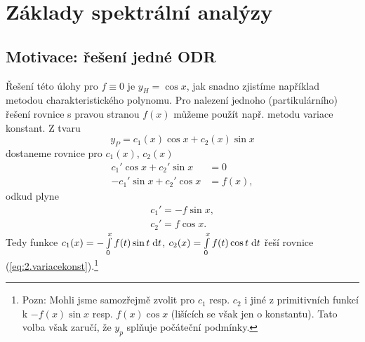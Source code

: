 



\section{Základy spektrální analýzy}

\subsection{Motivace: řešení jedné ODR}

Řešení této úlohy pro $f\equiv 0$ je $y_H=\cos x$, jak snadno zjistíme například metodou charakteristického polynomu. Pro nalezení jednoho (partikulárního) řešení rovnice s pravou stranou $f(x)$ můžeme použít např. metodu variace konstant. Z tvaru
\begin{equation}
    y_P=c_1(x) \cos x+c_2(x) \sin x
\end{equation}
dostaneme rovnice pro $c_1(x)$, $c_2(x)$
\begin{equation}
    \begin{split}
        c_1'\cos x+c_2'\sin x&=0\\
        -c_1'\sin x+c_2'\cos x&=f(x),
    \end{split}
    \label{eq:2.variacekonst}
\end{equation}
odkud plyne
\begin{equation}
    \begin{split}
        c_1'=-f \sin x, \\
        c_2'=f\cos x.
    \end{split}
\end{equation}
Tedy funkce $ c_1(x) = -\int\limits_0^xf(t)\sin t \;\mathrm{d}t$, $ c_2(x) = \int\limits_0^xf(t)\cos t \;\mathrm{d}t$ řeší rovnice (\ref{eq:2.variacekonst}).\footnote{Pozn: Mohli jsme samozřejmě zvolit pro $c_1$ resp. $c_2$ i jiné z primitivních funkcí k $-f(x)\sin x$ resp. $f(x) \cos x$ (lišících se však jen o konstantu). Tato volba však zaručí, že $y_p$ splňuje počáteční podmínky.}

